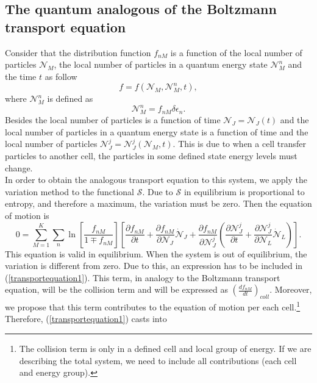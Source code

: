 \documentclass{article}
\newcommand{\Ss}{\mathcal{S}}
\begin{document}
  \subsection{The quantum analogous of the Boltzmann transport equation}
Consider that the distribution function $f_{nM}$ is a function of the local number of particles $\mathcal{N}_M$, the local number of particles in a quantum energy state $\mathcal{N}_{M}^{n}$ and the time $t$ as follow
\begin{equation}
    f=f(\mathcal{N}_M,\mathcal{N}_M^{n},t),
\end{equation}
where $\mathcal{N}_{M}^{n}$ is defined as
\begin{equation}
    \mathcal{N}_{M}^{n}= f_{nM} \delta \epsilon_n.
\end{equation}
Besides the local number of particles is a function of time $\mathcal{N}_J=\mathcal{N}_J(t)$ and the local number of particles in a quantum energy state is a function of time and the local number of particles $\mathcal{N}_J^{j}=\mathcal{N}_J^{j}(\mathcal{N}_M,t)$. This is due to when a cell transfer particles to another cell, the particles in some defined state energy levels must change.\\
In order to obtain the analogous transport equation to this system, we apply the variation method to the functional $\Ss$. Due to $\Ss$ in equilibrium is proportional to entropy, and therefore a maximum, the variation must be zero. Then the equation of motion is
\begin{equation}
    0=\sum_{M=1}^{K} \sum_n \ln \left[ \frac{f_{nM}}{1\mp f_{nM}} \right] \left[ \frac{\partial f_{nM}}{\partial t}+\frac{\partial f_{nM}}{\partial \mathcal{N}_J}\dot{\mathcal{N}}_J+\frac{\partial f_{nM}}{\partial \mathcal{N}_J^{j}}\left( \frac{\partial \mathcal{N}_J^{j}}{\partial t}+\frac{\partial \mathcal{N}_J^{j}}{\partial \mathcal{N}_L}\dot{\mathcal{N}}_L \right) \right]. \label{transportequation1}
\end{equation}
This equation is valid in equilibrium. When the system is out of equilibrium, the variation is different from zero. Due to this, an expression has to be included in (\ref{transportequation1}). This term, in analogy to the Boltzmann transport equation, will be the collision term and will be expressed as $\left( \frac{df_{nM}}{dt} \right)_{coll}$. Moreover, we propose that this term contributes to the equation of motion per each cell.\footnote{The collision term is only in a defined cell and local group of energy. If we are describing the total system, we need to include all contributions (each cell and energy group).} Therefore, (\ref{transportequation1}) casts into
\end{document}
